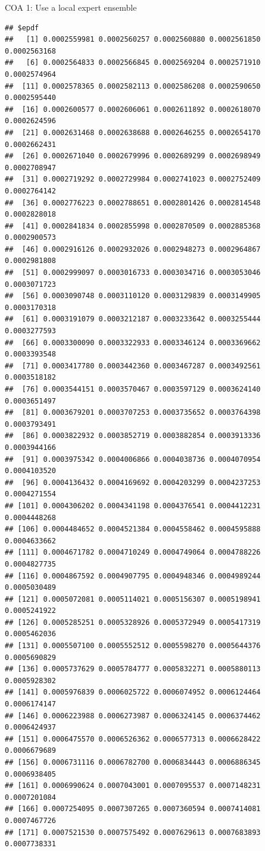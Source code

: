 \documentclass[ignorenonframetext,]{beamer}
\begin{document}
\begin{frame}[fragile]{COA 1: Use a local expert ensemble}
\begin{verbatim}
## $epdf
##   [1] 0.0002559981 0.0002560257 0.0002560880 0.0002561850 0.0002563168
##   [6] 0.0002564833 0.0002566845 0.0002569204 0.0002571910 0.0002574964
##  [11] 0.0002578365 0.0002582113 0.0002586208 0.0002590650 0.0002595440
##  [16] 0.0002600577 0.0002606061 0.0002611892 0.0002618070 0.0002624596
##  [21] 0.0002631468 0.0002638688 0.0002646255 0.0002654170 0.0002662431
##  [26] 0.0002671040 0.0002679996 0.0002689299 0.0002698949 0.0002708947
##  [31] 0.0002719292 0.0002729984 0.0002741023 0.0002752409 0.0002764142
##  [36] 0.0002776223 0.0002788651 0.0002801426 0.0002814548 0.0002828018
##  [41] 0.0002841834 0.0002855998 0.0002870509 0.0002885368 0.0002900573
##  [46] 0.0002916126 0.0002932026 0.0002948273 0.0002964867 0.0002981808
##  [51] 0.0002999097 0.0003016733 0.0003034716 0.0003053046 0.0003071723
##  [56] 0.0003090748 0.0003110120 0.0003129839 0.0003149905 0.0003170318
##  [61] 0.0003191079 0.0003212187 0.0003233642 0.0003255444 0.0003277593
##  [66] 0.0003300090 0.0003322933 0.0003346124 0.0003369662 0.0003393548
##  [71] 0.0003417780 0.0003442360 0.0003467287 0.0003492561 0.0003518182
##  [76] 0.0003544151 0.0003570467 0.0003597129 0.0003624140 0.0003651497
##  [81] 0.0003679201 0.0003707253 0.0003735652 0.0003764398 0.0003793491
##  [86] 0.0003822932 0.0003852719 0.0003882854 0.0003913336 0.0003944166
##  [91] 0.0003975342 0.0004006866 0.0004038736 0.0004070954 0.0004103520
##  [96] 0.0004136432 0.0004169692 0.0004203299 0.0004237253 0.0004271554
## [101] 0.0004306202 0.0004341198 0.0004376541 0.0004412231 0.0004448268
## [106] 0.0004484652 0.0004521384 0.0004558462 0.0004595888 0.0004633662
## [111] 0.0004671782 0.0004710249 0.0004749064 0.0004788226 0.0004827735
## [116] 0.0004867592 0.0004907795 0.0004948346 0.0004989244 0.0005030489
## [121] 0.0005072081 0.0005114021 0.0005156307 0.0005198941 0.0005241922
## [126] 0.0005285251 0.0005328926 0.0005372949 0.0005417319 0.0005462036
## [131] 0.0005507100 0.0005552512 0.0005598270 0.0005644376 0.0005690829
## [136] 0.0005737629 0.0005784777 0.0005832271 0.0005880113 0.0005928302
## [141] 0.0005976839 0.0006025722 0.0006074952 0.0006124464 0.0006174147
## [146] 0.0006223988 0.0006273987 0.0006324145 0.0006374462 0.0006424937
## [151] 0.0006475570 0.0006526362 0.0006577313 0.0006628422 0.0006679689
## [156] 0.0006731116 0.0006782700 0.0006834443 0.0006886345 0.0006938405
## [161] 0.0006990624 0.0007043001 0.0007095537 0.0007148231 0.0007201084
## [166] 0.0007254095 0.0007307265 0.0007360594 0.0007414081 0.0007467726
## [171] 0.0007521530 0.0007575492 0.0007629613 0.0007683893 0.0007738331

\end{verbatim}
\end{frame}
\end{document}
